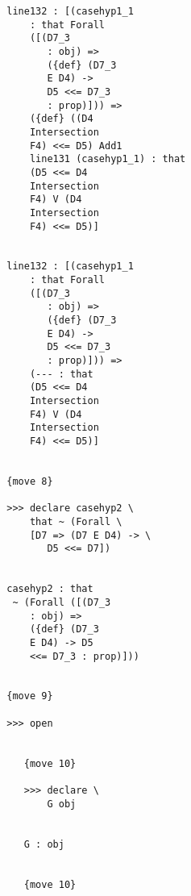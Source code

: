 \documentclass[12pt]{article}
\begin{document}
\begin{verbatim}
                           line132 : [(casehyp1_1 
                               : that Forall 
                               ([(D7_3 
                                  : obj) => 
                                  ({def} (D7_3 
                                  E D4) -> 
                                  D5 <<= D7_3 
                                  : prop)])) => 
                               ({def} ((D4 
                               Intersection 
                               F4) <<= D5) Add1 
                               line131 (casehyp1_1) : that 
                               (D5 <<= D4 
                               Intersection 
                               F4) V (D4 
                               Intersection 
                               F4) <<= D5)]


                           line132 : [(casehyp1_1 
                               : that Forall 
                               ([(D7_3 
                                  : obj) => 
                                  ({def} (D7_3 
                                  E D4) -> 
                                  D5 <<= D7_3 
                                  : prop)])) => 
                               (--- : that 
                               (D5 <<= D4 
                               Intersection 
                               F4) V (D4 
                               Intersection 
                               F4) <<= D5)]


                           {move 8}

                           >>> declare casehyp2 \
                               that ~ (Forall \
                               [D7 => (D7 E D4) -> \
                                  D5 <<= D7])


                           casehyp2 : that 
                            ~ (Forall ([(D7_3 
                               : obj) => 
                               ({def} (D7_3 
                               E D4) -> D5 
                               <<= D7_3 : prop)]))


                           {move 9}

                           >>> open


                              {move 10}

                              >>> declare \
                                  G obj


                              G : obj


                              {move 10}


\end{verbatim}
\end{document}
